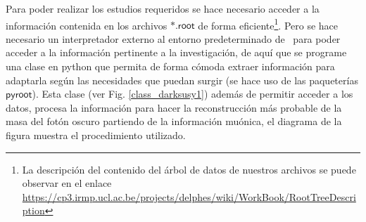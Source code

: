 

Para poder realizar los estudios requeridos se hace necesario acceder a la información contenida en los archivos $\textsf{*.root}$ de forma eficiente\footnote{La descripción del contenido del árbol de datos de nuestros archivos se puede observar en el enlace \href{https://cp3.irmp.ucl.ac.be/projects/delphes/wiki/WorkBook/RootTreeDescription}{https://\-cp3.\-irmp.\-ucl.\-ac.\-be/\-pro\-jects/\-delphes/\-wiki/\-Work\-Book/\-Root\-Tree\-Des\-crip\-tion}}. Pero se hace necesario un interpretador externo al entorno predeterminado de \ROOT ~para poder acceder a la información pertinente a la investigación, de aquí que se programe una clase en python que permita de forma cómoda extraer información para adaptarla según las necesidades que puedan surgir (se hace uso de las paqueterías $\textsf{pyroot}$). Esta clase (ver Fig. \ref{class_darksusy1}) además de permitir acceder a los datos, procesa la información para hacer la reconstrucción más probable de la masa del fotón oscuro partiendo de la información muónica, el diagrama de la figura muestra el procedimiento utilizado.

